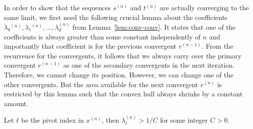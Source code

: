 In order to show that the sequences $s^{(n)}$ and $t^{(n)}$ are actually
converging to the same limit, we first need the following crucial lemma about the
coefficients $λ₀^{(n)}, λ₁^{(n)}, …, λ_d^{(n)}$ from Lemma~\ref{lem:conv-conv}.
It states that one of the coefficients is always greater than some constant
independently of $n$ and importantly that coefficient is for the previous convergent $r^{(n-1)}$.
From the recurrence for the convergents,
it follows that we always carry over the primary convergent $r^{(n-1)}$ as one
of the secondary convergents in the next iteration.
Therefore, we cannot change its position.
However, we can change one of the other convergents.
But the area available for the next convergent $r^{(n)}$ is restricted by this lemma
such that the convex hull always shrinks by a constant amount.

\begin{lemma}
  \label{lem:lambda-pos}
  Let $ℓ$ be the pivot index in $x^{(n)}$,
  then $λ_ℓ^{(n)} > 1/C$ for some integer $C > 0$.
\end{lemma}

